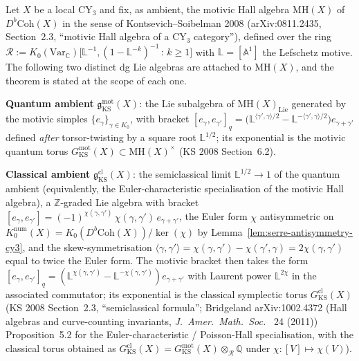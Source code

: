 \begin{theorem}
\label{thm:ks-wall-crossing-mc-on-coha-dgla}
Let $X$ be a local CY$_3$ and fix, as ambient, the motivic Hall algebra
$\mathrm{MH}(X)$ of $D^b\mathrm{Coh}(X)$ in the sense of
Kontsevich--Soibelman 2008 (\textup{arXiv:0811.2435}, Section~2.3,
``motivic Hall algebra of a CY$_3$ category''), defined over the
ring
$\mathcal{R} := K_0(\mathrm{Var}_{\mathbb{C}})\bigl[\mathbb{L}^{-1},
 (1 - \mathbb{L}^{-k})^{-1}\,:\,k \geq 1\bigr]$
with $\mathbb{L} = [\mathbb{A}^1]$ the Lefschetz motive. The following
two distinct dg Lie algebras are attached to $\mathrm{MH}(X)$, and the
theorem is stated at the scope of each one.

\textbf{Quantum ambient}
$\mathfrak{g}_{\mathrm{KS}}^{\mathrm{mot}}(X)$: the Lie subalgebra of
$\mathrm{MH}(X)_{\mathrm{Lie}}$ generated by the motivic simples
$\{e_\gamma\}_{\gamma \in K_0}$, with bracket
$[e_\gamma, e_{\gamma'}]_q =
 \bigl(\mathbb{L}^{\langle\gamma',\gamma\rangle/2}
 - \mathbb{L}^{-\langle\gamma',\gamma\rangle/2}\bigr)
 e_{\gamma+\gamma'}$
defined \emph{after} torsor-twisting by a square root
$\mathbb{L}^{1/2}$; its exponential is the motivic quantum torus
$G_{\mathrm{KS}}^{\mathrm{mot}}(X) \subset \mathrm{MH}(X)^\times$
(KS 2008 Section~6.2).

\textbf{Classical ambient}
$\mathfrak{g}_{\mathrm{KS}}^{\mathrm{cl}}(X)$: the semiclassical limit
$\mathbb{L}^{1/2} \to 1$ of the quantum ambient (equivalently, the
Euler-characteristic specialisation of the motivic Hall algebra), a
$\mathbb{Z}$-graded Lie algebra with bracket
$[e_\gamma, e_{\gamma'}] = (-1)^{\chi(\gamma,\gamma')}\,
 \chi(\gamma,\gamma')\, e_{\gamma + \gamma'}$,
the Euler form $\chi$ antisymmetric on
$K_0^{\mathrm{num}}(X) = K_0(D^b\mathrm{Coh}(X))/\ker(\chi)$ by
Lemma~\ref{lem:serre-antisymmetry-cy3}, and the
skew-symmetrisation $\langle\gamma, \gamma'\rangle = \chi(\gamma,
\gamma') - \chi(\gamma', \gamma) = 2\chi(\gamma, \gamma')$ equal to
twice the Euler form. The motivic bracket then takes the form
$[e_\gamma, e_{\gamma'}]_q = (\mathbb{L}^{\chi(\gamma,\gamma')} -
\mathbb{L}^{-\chi(\gamma, \gamma')}) e_{\gamma + \gamma'}$
with Laurent power $\mathbb{L}^{2\chi}$ in the associated commutator;
its exponential is the classical symplectic torus
$G_{\mathrm{KS}}^{\mathrm{cl}}(X)$ (KS 2008 Section~2.3,
``semiclassical formula''; Bridgeland \textup{arXiv:1002.4372} (Hall
algebras and curve-counting invariants, \emph{J.~Amer.~Math.~Soc.\ }
24 (2011)) Proposition~5.2 for the Euler-characteristic / Poisson-Hall
specialisation, with the classical torus obtained as
$G_{\mathrm{KS}}^{\mathrm{cl}}(X) = G_{\mathrm{KS}}^{\mathrm{mot}}(X)
 \otimes_{\mathcal{R}} \mathbb{Q}$
under $\chi \colon [V] \mapsto \chi(V)$).


\end{theorem}
